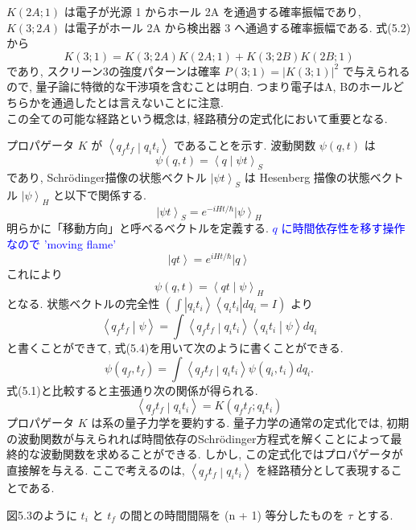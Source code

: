\documentclass[a4paper,12pt]{article}
\newcommand{\bra}[1]{\left\langle #1\right|}
\newcommand{\ket}[1]{\left|#1\right\rangle}
\newcommand{\braket}[2]{\left\langle #1\middle|#2\right\rangle}
\begin{document}
$K(2A; 1)$ は電子が光源 1 からホール 2A を通過する確率振幅であり, $K(3; 2A)$ は電子がホール 2A から検出器 3 へ通過する確率振幅である. 式(5.2)から
\begin{equation*}
    K(3; 1) = K(3; 2A)K(2A; 1) + K(3; 2B)K(2B; 1)
\end{equation*}
であり, スクリーン3の強度パターンは確率 $P(3; 1) = |K(3; 1)|^2$ で与えられるので, 量子論に特徴的な干渉項を含むことは明白. つまり電子はA, Bのホールどちらかを通過したとは言えないことに注意.\\
この全ての可能な経路という概念は, 経路積分の定式化において重要となる.\par
プロパゲータ $K$ が $\braket{q_{f}t_{f}}{q_{i}t_{i}}$ であることを示す. 波動関数 $\psi(q, t)$ は\\
\begin{equation*}
    \psi(q, t) = \braket{q}{\psi t}_{S}
\end{equation*}
であり, Schr\"{o}dinger描像の状態ベクトル $\ket{\psi t}_{S}$ は Hesenberg 描像の状態ベクトル $\ket{\psi}_{H}$ と以下で関係する.
\begin{equation*}
    \ket{\psi t}_{S} = e^{-iHt/\hbar}\ket{\psi}_{H}
\end{equation*}
明らかに「移動方向」と呼べるベクトルを定義する. \textcolor{blue}{$q$ に時間依存性を移す操作なので 'moving flame'}
\begin{equation*}
    \ket{qt} = e^{iHt/\hbar}\ket{q} \tag{5.3}
\end{equation*}
これにより
\begin{equation*}
    \psi(q, t) = \braket{qt}{\psi}_{H} \tag{5.4}
\end{equation*}
となる. 状態ベクトルの完全性 $\displaystyle \left( \int \ket{q_i t_i}\bra{q_i t_i}dq_i = I \right) $ より
\begin{equation*}
    \braket{q_{f}t_{f}}{\psi} = \int \braket{q_{f}t_{f}}{q_{i}t_{i}}\braket{q_{i}t_{i}}{\psi}dq_{i}
\end{equation*}
と書くことができて, 式(5.4)を用いて次のように書くことができる.
\begin{equation*}
    \psi(q_{f}, t_{f}) = \int \braket{q_{f}t_{f}}{q_{i}t_{i}}\psi(q_{i}, t_{i})dq_{i}.
\end{equation*}
式(5.1)と比較すると主張通り次の関係が得られる.
\begin{equation*}
    \braket{q_{f}t_{f}}{q_{i}t_{i}} = K(q_{f}t_{f}; q_{i}t_{i}) \tag{5.5}
\end{equation*}
プロパゲータ $K$ は系の量子力学を要約する. 量子力学の通常の定式化では, 初期の波動関数が与えられれば時間依存のSchr\"{o}dinger方程式を解くことによって最終的な波動関数を求めることができる. しかし, この定式化ではプロパゲータが直接解を与える. ここで考えるのは, $\braket{q_{f}t_{f}}{q_{i}t_{i}}$ を経路積分として表現することである.\par
図5.3のように $t_{i}$ と $t_{f}$ の間との時間間隔を (n + 1) 等分したものを $\tau$ とする.
\end{document}
